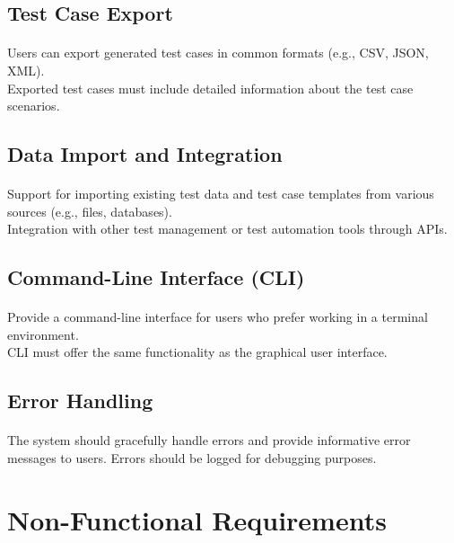 \documentclass{article}
\begin{document}
\subsection{Test Case Export}
\paragraph{}
Users can export generated test cases in common formats (e.g., CSV, JSON, XML).\\
Exported test cases must include detailed information about the test case scenarios.

\subsection{Data Import and Integration}
\paragraph{}
Support for importing existing test data and test case templates from various sources (e.g., files, databases).\\
Integration with other test management or test automation tools through APIs.

\subsection{Command-Line Interface (CLI)}
\paragraph{}
Provide a command-line interface for users who prefer working in a terminal environment.\\
CLI must offer the same functionality as the graphical user interface.

\subsection{Error Handling}
\paragraph{}
The system should gracefully handle errors and provide informative error messages to users.
Errors should be logged for debugging purposes.


\section{Non-Functional Requirements}
\end{document}
